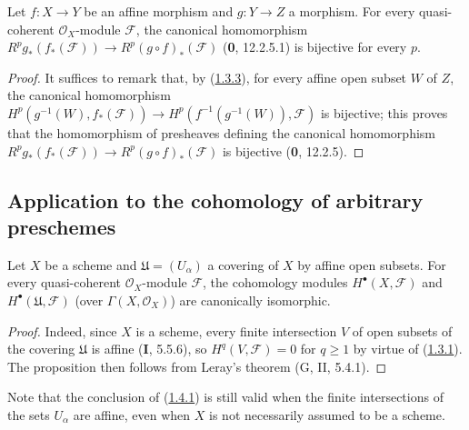 \begin{corollary}[1.3.4]
\label{III.1.3.4}
Let $f:X\to Y$ be an affine morphism and $g:Y\to Z$ a morphism.
For every quasi-coherent $\mathcal O_X$-module $\mathcal F$,
the canonical homomorphism
$R^pg_*(f_*(\mathcal F))\to R^p(g\circ f)_*(\mathcal F)$ \textup{(\textbf{0}, 12.2.5.1)}
is bijective for every $p$.
\end{corollary}

\begin{proof}
It suffices to remark that, by
(\hyperref[III.1.3.3]{1.3.3}), for every affine open subset $W$ of $Z$,
the canonical homomorphism
$H^p(g^{-1}(W),f_*(\mathcal F))\to
H^p(f^{-1}(g^{-1}(W)),\mathcal F)$ is bijective; this proves that
the homomorphism of presheaves defining the canonical homomorphism
$R^pg_*(f_*(\mathcal F))\to R^p(g\circ f)_*(\mathcal F)$ is bijective
(\textbf{0}, 12.2.5).
\end{proof}


\subsection{Application to the cohomology of arbitrary preschemes}
\label{subsection:III.1.4}

\begin{proposition}[1.4.1]
\label{III.1.4.1}
Let $X$ be a scheme and $\mathfrak U=(U_\alpha)$ a covering of $X$ by
affine open subsets. For every quasi-coherent $\mathcal O_X$-module
$\mathcal F$, the cohomology modules $H^\bullet(X,\mathcal F)$ and
$H^\bullet(\mathfrak U,\mathcal F)$ (over $\Gamma(X,\mathcal O_X)$) are
canonically isomorphic.
\end{proposition}

\begin{proof}
Indeed, since $X$ is a scheme, every finite intersection $V$ of open subsets
of the covering $\mathfrak U$ is affine (\textbf{I}, 5.5.6), so
$H^q(V,\mathcal F)=0$ for $q\geq1$ by virtue of
(\hyperref[III.1.3.1]{1.3.1}). The proposition then follows from Leray's
theorem (G, II, 5.4.1).
\end{proof}

\begin{remark}[1.4.2]
\label{III.1.4.2}
Note that the conclusion of (\hyperref[III.1.4.1]{1.4.1}) is still
valid when the finite intersections of the sets $U_\alpha$ are
affine, even when $X$ is not necessarily assumed to be a
scheme.
\end{remark}

